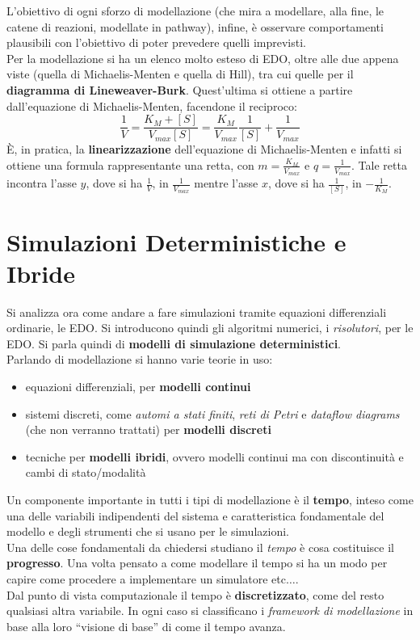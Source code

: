 \documentclass[a4paper,12pt, oneside]{book}
\begin{document}
L'obiettivo di ogni sforzo di modellazione (che mira a modellare, alla fine, le
catene di reazioni, modellate in pathway), infine, è osservare comportamenti
plausibili con l'obiettivo di poter prevedere quelli imprevisti.\\
Per la modellazione si ha un elenco molto esteso di EDO, oltre alle due appena
viste (quella di Michaelis-Menten e quella di Hill), tra cui quelle per il
\textbf{diagramma di Lineweaver-Burk}. Quest'ultima si ottiene a partire
dall'equazione di Michaelis-Menten, facendone il reciproco:
\[\frac{1}{V}=\frac{K_M+[S]}{V_{max}[S]}=\frac{K_M}{V_{max}}\frac{1}{[S]}+
  \frac{1}{V_{max}}\]
È, in pratica, la \textbf{linearizzazione} dell'equazione di Michaelis-Menten e
infatti si ottiene una formula rappresentante una retta, con
$m=\frac{K_M}{V_{max}}$ e $q= \frac{1}{V_{max}}$. Tale retta incontra
l'asse $y$, dove si ha $\frac{1}{V}$, in $\frac{1}{V_{max}}$ mentre l'asse $x$,
dove si ha $\frac{1}{[S]}$, in $-\frac{1}{K_M}$.
\chapter{Simulazioni Deterministiche e Ibride}
Si analizza ora come andare a fare simulazioni tramite equazioni differenziali
ordinarie, le EDO. Si introducono quindi gli algoritmi numerici, i
\textit{risolutori}, per le EDO. Si parla quindi di \textbf{modelli di
  simulazione deterministici}. \\
Parlando di modellazione si hanno varie teorie in uso:
\begin{itemize}
  \item equazioni differenziali, per \textbf{modelli continui}
  \item sistemi discreti, come \textit{automi a stati finiti}, \textit{reti di
    Petri} e \textit{dataflow diagrams} (che non verranno trattati) per
  \textbf{modelli discreti} 
  \item tecniche per \textbf{modelli ibridi}, ovvero modelli continui ma con
  discontinuità e cambi di stato/modalità
\end{itemize}
Un componente importante in tutti i tipi di modellazione è il \textbf{tempo},
inteso come una delle variabili indipendenti del sistema e caratteristica
fondamentale del modello e degli strumenti che si usano per le simulazioni. \\
Una delle cose fondamentali da chiedersi studiano il \textit{tempo} è cosa
costituisce il \textbf{progresso}. Una volta pensato a come modellare il tempo
si ha un modo per capire come procedere a implementare un simulatore
etc$\ldots$. \\
Dal punto di vista computazionale il tempo è \textbf{discretizzato}, come del
resto qualsiasi altra variabile. In ogni caso si classificano i
\textit{framework di modellazione} in base alla loro ``visione di base'' di come
il tempo avanza.\\
\end{document}
